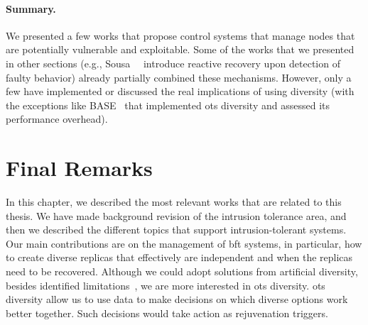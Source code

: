 \paragraph{Summary.}
We presented a few works that propose control systems that manage nodes that are potentially vulnerable and exploitable.
Some of the works that we presented in other sections (e.g., Sousa~\etal{}~\cite{Sousa:2010} introduce reactive recovery upon detection of faulty behavior) already partially combined these mechanisms. 
However, only a few have implemented or discussed the real implications of using diversity (with the exceptions like BASE~\cite{Rodrigues:2001} that implemented \gls{ots} diversity and assessed its performance overhead).


\section{Final Remarks}
In this chapter, we described the most relevant works that are related to this thesis.
We have made background revision of the intrusion tolerance area, and then we described the different topics that support intrusion-tolerant systems.
Our main contributions are on the management of \gls{bft} systems, in particular, how to create diverse replicas that effectively are independent and when the replicas need to be recovered. 
Although we could adopt solutions from artificial diversity, besides identified limitations~\cite{Snow:2013,Bittau:2014}, we are more interested in \gls{ots} diversity.
\gls{ots} diversity allow us to use data to make decisions on which diverse options work better together.
Such decisions would take action as rejuvenation triggers. 




